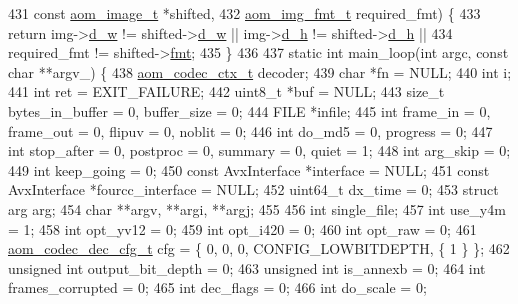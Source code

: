 \begin{DoxyCodeInclude}
{{{{{{{{{{{{{{{{{{{{{{{{{431                                         \textcolor{keyword}{const} \hyperlink{structaom__image}{aom\_image\_t} *shifted,
432                                         \hyperlink{aom__image_8h_ab71efff8c7f49380fad23b93bc2e9bfc}{aom\_img\_fmt\_t} required\_fmt) \{
433   \textcolor{keywordflow}{return} img->\hyperlink{structaom__image_a89f80b1f58d608b9d2080635f4359034}{d\_w} != shifted->\hyperlink{structaom__image_a89f80b1f58d608b9d2080635f4359034}{d\_w} || img->\hyperlink{structaom__image_ab986419a1f0fff93a2dc505f47194988}{d\_h} != shifted->\hyperlink{structaom__image_ab986419a1f0fff93a2dc505f47194988}{d\_h} ||
434          required\_fmt != shifted->\hyperlink{structaom__image_a6c64b1ab918d80d52eb8f5d6d957e825}{fmt};
435 \}
436 
437 \textcolor{keyword}{static} \textcolor{keywordtype}{int} main\_loop(\textcolor{keywordtype}{int} argc, \textcolor{keyword}{const} \textcolor{keywordtype}{char} **argv\_) \{
438   \hyperlink{structaom__codec__ctx}{aom\_codec\_ctx\_t} decoder;
439   \textcolor{keywordtype}{char} *fn = NULL;
440   \textcolor{keywordtype}{int} i;
441   \textcolor{keywordtype}{int} ret = EXIT\_FAILURE;
442   uint8\_t *buf = NULL;
443   \textcolor{keywordtype}{size\_t} bytes\_in\_buffer = 0, buffer\_size = 0;
444   FILE *infile;
445   \textcolor{keywordtype}{int} frame\_in = 0, frame\_out = 0, flipuv = 0, noblit = 0;
446   \textcolor{keywordtype}{int} do\_md5 = 0, progress = 0;
447   \textcolor{keywordtype}{int} stop\_after = 0, postproc = 0, summary = 0, quiet = 1;
448   \textcolor{keywordtype}{int} arg\_skip = 0;
449   \textcolor{keywordtype}{int} keep\_going = 0;
450   \textcolor{keyword}{const} AvxInterface *\textcolor{keyword}{interface }= NULL;
451   \textcolor{keyword}{const} AvxInterface *fourcc\_interface = NULL;
452   uint64\_t dx\_time = 0;
453   \textcolor{keyword}{struct }arg arg;
454   \textcolor{keywordtype}{char} **argv, **argi, **argj;
455 
456   \textcolor{keywordtype}{int} single\_file;
457   \textcolor{keywordtype}{int} use\_y4m = 1;
458   \textcolor{keywordtype}{int} opt\_yv12 = 0;
459   \textcolor{keywordtype}{int} opt\_i420 = 0;
460   \textcolor{keywordtype}{int} opt\_raw = 0;
461   \hyperlink{structaom__codec__dec__cfg}{aom\_codec\_dec\_cfg\_t} cfg = \{ 0, 0, 0, CONFIG\_LOWBITDEPTH, \{ 1 \} \};
462   \textcolor{keywordtype}{unsigned} \textcolor{keywordtype}{int} output\_bit\_depth = 0;
463   \textcolor{keywordtype}{unsigned} \textcolor{keywordtype}{int} is\_annexb = 0;
464   \textcolor{keywordtype}{int} frames\_corrupted = 0;
465   \textcolor{keywordtype}{int} dec\_flags = 0;
466   \textcolor{keywordtype}{int} do\_scale = 0;
}}}}}}}}}}}}}}}}}}}}}}}}}
\end{DoxyCodeInclude}
